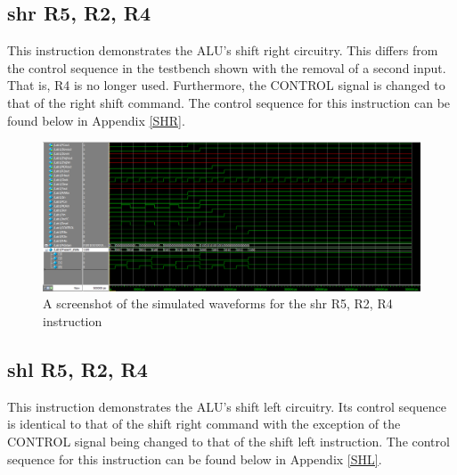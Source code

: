 \documentclass{article}
\begin{document}

    \subsection{shr R5, R2, R4}
    This instruction demonstrates the ALU's shift right circuitry. This differs from the control sequence in the testbench shown with the removal of a second input. That is, R4 is no longer used. Furthermore, the CONTROL signal is changed to that of the right shift command. The control sequence for this instruction can be found below in Appendix \ref{SHR}.
    
    \begin{figure}[h!]
        \begin{center}
            \includegraphics[width=13cm]{shr}
            \caption{A screenshot of the simulated waveforms for the shr R5, R2, R4 instruction}
        \end{center}
    \end{figure}

    \subsection{shl R5, R2, R4}
    This instruction demonstrates the ALU's shift left circuitry. Its control sequence is identical to that of the shift right command with the exception of the CONTROL signal being changed to that of the shift left instruction. The control sequence for this instruction can be found below in Appendix \ref{SHL}.
\end{document}
